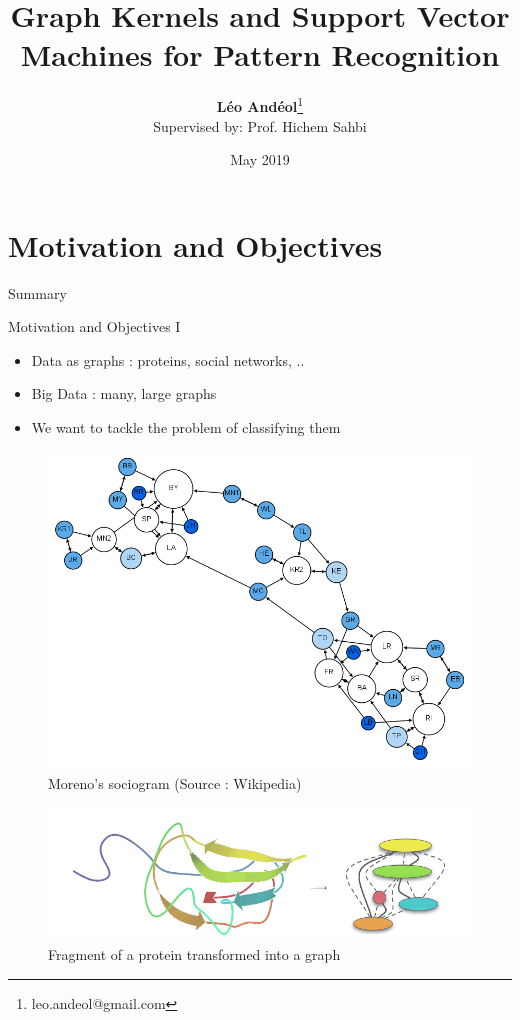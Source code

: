 \documentclass[compress]{beamer}
\title[Graph Kernels]{Graph Kernels and Support Vector Machines for Pattern Recognition}
\author[Léo Andéol]{\textbf{Léo Andéol}\thanks{leo.andeol@gmail.com}\\ \footnotesize Supervised by: Prof. Hichem Sahbi}
\institute[Sorbonne Uni.]{Master DAC - Sorbonne Université}
\date{May 2019}
\begin{document}
\begin{frame}
  \titlepage
\end{frame}

\section{Motivation and Objectives}
\begin{frame}{Summary}
  \tableofcontents[currentsection]
\end{frame}
\begin{frame}{Motivation and Objectives I}
\begin{multicols}{2}
	\begin{itemize}
		\item Data as graphs : proteins, social networks, ..
		\item Big Data : many, large graphs
		\item We want to tackle the problem of classifying them
	\end{itemize}
	\begin{figure}
		\includegraphics[height=.3\textheight]{data/sociogram.png}\par
		\caption*{\footnotesize Moreno's sociogram (Source : Wikipedia)}
	\end{figure}
\end{multicols}

\begin{figure}
	\centering
	\vspace*{-0.5cm}
	\includegraphics[height=.25\textheight]{data/ecoli.png}
\caption*{Fragment of a protein transformed into a graph \citep{vishwanathan_graph_2010}}
\end{figure}

\end{frame}
\end{document}
